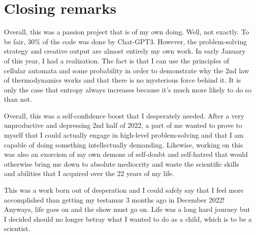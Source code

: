 \chapter{Closing remarks}
Overall, this was a passion project that is of my own doing. Well, not exactly. To be fair, 30\% of the code was done by Chat-GPT3. However, the problem-solving strategy and creative output are almost entirely my own work. In early January of this year, I had a realization. The fact is that I can use the principles of cellular automata and some probability in order to demonstrate why the 2nd law of thermodynamics works and that there is no mysterious force behind it. It is only the case that entropy always increases because it's much more likely to do so than not. \par

\vspace{0.3cm}
\noindent
Overall, this was a self-confidence boost that I desperately needed. After a very unproductive and depressing 2nd half of 2022, a part of me wanted to prove to myself that I could actually engage in high-level problem-solving and that I am capable of doing something intellectually demanding. Likewise, working on this was also an exorcism of my own demons of self-doubt and self-hatred that would otherwise bring me down to absolute mediocrity and waste the scientific skills and abilities that I acquired over the 22 years of my life. \par

\vspace{0,3cm}
\noindent
This was a work born out of desperation and I could safely say that I feel more accomplished than getting my testamur 3 months ago in December 2022! Anyways, life goes on and the show must go on. Life was a long hard journey but I decided should no longer betray what I wanted to do as a child, which is to be a scientist. 